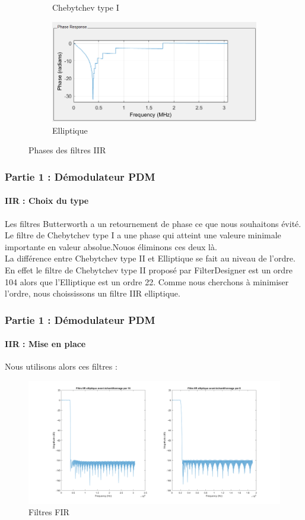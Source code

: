 \documentclass[
10pt,
aspectratio=169,
]{beamer}
\begin{document}
\begin{frame}
\begin{figure}
\begin{subfigure}{0.4\textwidth}
    \caption{Chebytchev type I}
\end{subfigure}
\begin{subfigure}{0.4\textwidth}
    \includegraphics[scale=0.3]{Images/Phase_IIR_elliptic.PNG}
    \caption{Elliptique}
\end{subfigure}
        
\caption{Phases des filtres IIR}
\label{fig:phases}
\end{figure}
\end{frame}

\begin{frame}
\frametitle{Partie 1 : Démodulateur PDM} 
\framesubtitle{IIR : Choix du type} 
Les filtres Butterworth a un retournement de phase ce que nous souhaitons évité. Le filtre de Chebytchev type I a une phase qui atteint une valeure minimale importante en valeur absolue.Nouos éliminons ces deux là.\\
La différence entre Chebytchev type II et Elliptique se fait au niveau de l'ordre. En effet le filtre de Chebytchev type II proposé par FilterDesigner est un ordre 104 alors que l'Elliptique est un ordre 22. Comme nous cherchons à minimiser l'ordre, nous choississons un filtre IIR elliptique.
\end{frame}

\begin{frame}
\frametitle{Partie 1 : Démodulateur PDM} 
\framesubtitle{IIR : Mise en place} 
Nous utilisons alors ces filtres : 
\begin{figure}[h]
    \centering
    \includegraphics[scale=0.2]{Images/IIR.png}
    \caption{Filtres FIR}
\end{figure}
\end{frame}
\end{document}
